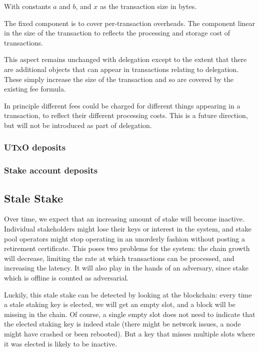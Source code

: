 \documentclass[11pt,a4paper]{article}
\begin{document}
With constants \(a\) and \(b\), and \(x\) as the transaction size in
bytes.

The fixed component is to cover per-transaction overheads. The component
linear in the size of the transaction to reflects the processing and
storage cost of transactions.

This aspect remains unchanged with delegation except to the extent that
there are additional objects that can appear in transactions relating to
delegation. These simply increase the size of the transaction and so are
covered by the existing fee formula.

In principle different fees could be charged for different things
appearing in a transaction, to reflect their different processing costs.
This is a future direction, but will not be introduced as part of
delegation.

\subsubsection{UTxO deposits}\label{utxo-deposits}

\subsubsection{Stake account deposits}\label{stake-account-deposits}

\subsection{Stale Stake}\label{stale-stake}

Over time, we expect that an increasing amount of stake will become
inactive. Individual stakeholders might lose their keys or interest in
the system, and stake pool operators might stop operating in an
unorderly fashion without posting a retirement certificate. This poses
two problems for the system: the chain growth will decrease, limiting
the rate at which transactions can be processed, and increasing the
latency. It will also play in the hands of an adversary, since stake
which is offline is counted as adversarial.

Luckily, this stale stake can be detected by looking at the blockchain:
every time a stale staking key is elected, we will get an empty slot,
and a block will be missing in the chain. Of course, a single empty slot
does not need to indicate that the elected staking key is indeed stale
(there might be network issues, a node might have crashed or been
rebooted). But a key that misses multiple slots where it was elected is
likely to be inactive.
\end{document}
